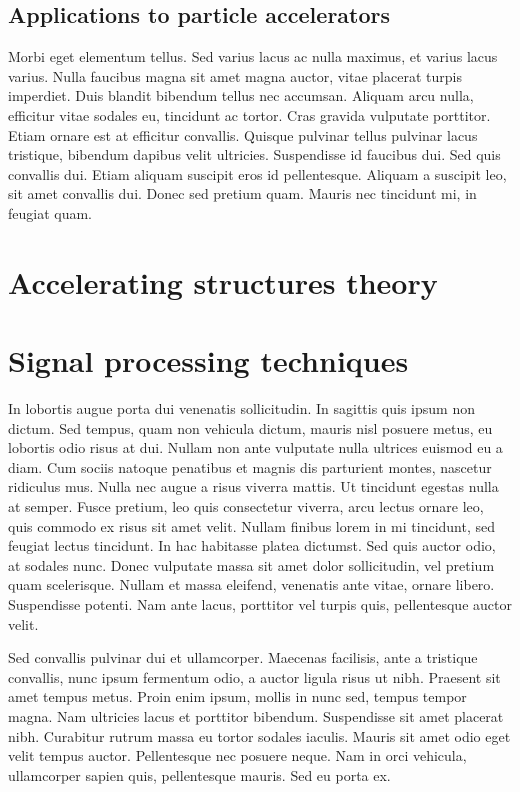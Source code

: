 \subsection[Applications to particle accelerators]{Applications to particle accelerators}

Morbi eget elementum tellus. Sed varius lacus ac nulla maximus, et varius lacus varius. Nulla faucibus magna sit amet magna auctor, vitae placerat turpis imperdiet. Duis blandit bibendum tellus nec accumsan. Aliquam arcu nulla, efficitur vitae sodales eu, tincidunt ac tortor. Cras gravida vulputate porttitor. Etiam ornare est at efficitur convallis. Quisque pulvinar tellus pulvinar lacus tristique, bibendum dapibus velit ultricies. Suspendisse id faucibus dui. Sed quis convallis dui. Etiam aliquam suscipit eros id pellentesque. Aliquam a suscipit leo, sit amet convallis dui. Donec sed pretium quam. Mauris nec tincidunt mi, in feugiat quam.

\section[Accelerating structures theory]{Accelerating structures theory}

\section[Signal processing techniques]{Signal processing techniques}
In lobortis augue porta dui venenatis sollicitudin. In sagittis quis ipsum non dictum. Sed tempus, quam non vehicula dictum, mauris nisl posuere metus, eu lobortis odio risus at dui. Nullam non ante vulputate nulla ultrices euismod eu a diam. Cum sociis natoque penatibus et magnis dis parturient montes, nascetur ridiculus mus. Nulla nec augue a risus viverra mattis. Ut tincidunt egestas nulla at semper. Fusce pretium, leo quis consectetur viverra, arcu lectus ornare leo, quis commodo ex risus sit amet velit. Nullam finibus lorem in mi tincidunt, sed feugiat lectus tincidunt. In hac habitasse platea dictumst. Sed quis auctor odio, at sodales nunc. Donec vulputate massa sit amet dolor sollicitudin, vel pretium quam scelerisque. Nullam et massa eleifend, venenatis ante vitae, ornare libero. Suspendisse potenti. Nam ante lacus, porttitor vel turpis quis, pellentesque auctor velit.

Sed convallis pulvinar dui et ullamcorper. Maecenas facilisis, ante a tristique convallis, nunc ipsum fermentum odio, a auctor ligula risus ut nibh. Praesent sit amet tempus metus. Proin enim ipsum, mollis in nunc sed, tempus tempor magna. Nam ultricies lacus et porttitor bibendum. Suspendisse sit amet placerat nibh. Curabitur rutrum massa eu tortor sodales iaculis. Mauris sit amet odio eget velit tempus auctor. Pellentesque nec posuere neque. Nam in orci vehicula, ullamcorper sapien quis, pellentesque mauris. Sed eu porta ex. 

